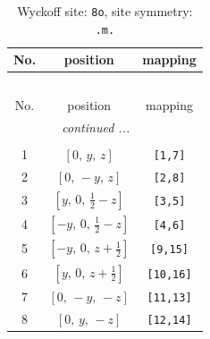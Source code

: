 \documentclass[fleqn,8pt]{jsarticle}
\begin{document}
\renewcommand{\arraystretch}{1.2}
\begin{longtable}{ccc}
\caption{Wyckoff site: {\tt 8o}, site symmetry: {\tt .m.}}
 \\
 \hline \hline
No. & position & mapping \\ \hline \endfirsthead

\multicolumn{2}{l}{\tablename\ \thetable{}} \\
 \hline \hline
No. & position & mapping \\ \hline \endhead

 \hline \hline
\multicolumn{2}{r}{\footnotesize\it continued ...} \\ \endfoot

 \hline \hline
\multicolumn{2}{r}{} \\ \endlastfoot

1 & $\left[ 0,\, y,\, z \right]$ & {\tt [1,7]} \\ \hline
2 & $\left[ 0,\, - y,\, z \right]$ & {\tt [2,8]} \\ \hline
3 & $\left[ y,\, 0,\, \frac{1}{2} - z \right]$ & {\tt [3,5]} \\ \hline
4 & $\left[ - y,\, 0,\, \frac{1}{2} - z \right]$ & {\tt [4,6]} \\ \hline
5 & $\left[ - y,\, 0,\, z + \frac{1}{2} \right]$ & {\tt [9,15]} \\ \hline
6 & $\left[ y,\, 0,\, z + \frac{1}{2} \right]$ & {\tt [10,16]} \\ \hline
7 & $\left[ 0,\, - y,\, - z \right]$ & {\tt [11,13]} \\ \hline
8 & $\left[ 0,\, y,\, - z \right]$ & {\tt [12,14]} \\
\end{longtable}
\renewcommand{\arraystretch}{1.2}
\end{document}
